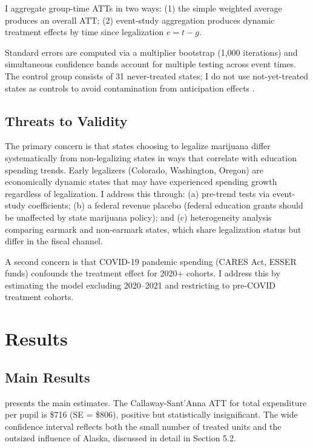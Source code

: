\documentclass[12pt]{article}
\begin{document}
I aggregate group-time ATTs in two ways: (1) the simple weighted average produces an overall ATT; (2) event-study aggregation produces dynamic treatment effects by time since legalization $e = t - g$.

Standard errors are computed via a multiplier bootstrap (1,000 iterations) and simultaneous confidence bands account for multiple testing across event times. The control group consists of 31 never-treated states; I do not use not-yet-treated states as controls to avoid contamination from anticipation effects \citep{marcus2021role}.

\subsection{Threats to Validity}

The primary concern is that states choosing to legalize marijuana differ systematically from non-legalizing states in ways that correlate with education spending trends. Early legalizers (Colorado, Washington, Oregon) are economically dynamic states that may have experienced spending growth regardless of legalization. I address this through: (a) pre-trend tests via event-study coefficients; (b) a federal revenue placebo (federal education grants should be unaffected by state marijuana policy); and (c) heterogeneity analysis comparing earmark and non-earmark states, which share legalization status but differ in the fiscal channel.

A second concern is that COVID-19 pandemic spending (CARES Act, ESSER funds) confounds the treatment effect for 2020+ cohorts. I address this by estimating the model excluding 2020--2021 and restricting to pre-COVID treatment cohorts.


\section{Results}

\subsection{Main Results}



 presents the main estimates. The Callaway-Sant'Anna ATT for total expenditure per pupil is \$716 (SE = \$806), positive but statistically insignificant. The wide confidence interval reflects both the small number of treated units and the outsized influence of Alaska, discussed in detail in Section 5.2.
\end{document}
